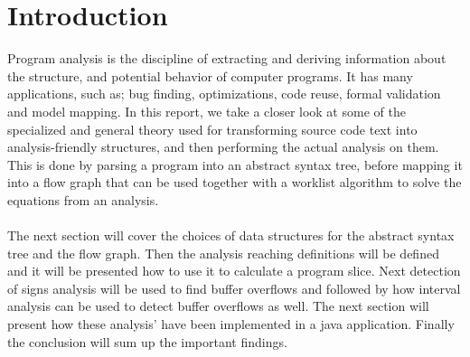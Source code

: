\chapter{Introduction}
Program analysis is the discipline of extracting and deriving information about the structure, and potential behavior of computer programs. It has many applications, such as; bug finding, optimizations, code reuse, formal validation and model mapping. In this report, we take a closer look at some of the specialized and general theory used for transforming source code text into analysis-friendly structures, and then performing the actual analysis on them. This is done by parsing a program into an abstract syntax tree, before mapping it into a flow graph that can be used together with a worklist algorithm to solve the equations from an analysis.
\\
\\
The next section will cover the choices of data structures for the abstract syntax tree and the flow graph. Then the analysis reaching definitions will be defined and it will be presented how to use it to calculate a program slice. Next detection of signs analysis will be used to find buffer overflows and followed by how interval analysis can be used to detect buffer overflows as well. The next section will present how these analysis' have been implemented in a java application. Finally the conclusion will sum up the important findings.